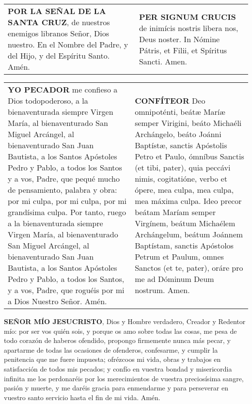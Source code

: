 \documentclass[./rosary.tex]{subfiles}
\begin{document}
\label{crossSignal}
\begin{longtable} { p{} p{} }
    \textbf{POR LA SEÑAL DE LA SANTA CRUZ}, de nuestros enemigos libranos Señor, Dios nuestro. En el Nombre del Padre,
    y del Hijo, y del Espíritu Santo. Amén.

     &

    \textbf{PER SIGNUM CRUCIS} de inimícis nostris libera nos, Deus noster. In Nómine Pátris, et Filii, et Spíritus Sancti. Amen.
\end{longtable}

\label{iConfess}
\begin{longtable} { p{} p{} }
    \textbf{YO PECADOR} me confieso a Dios todopoderoso, a la bienaventurada siempre Virgen María, al bienaventurado San Miguel Arcángel,
    al bienaventurado San Juan Bautista, a los Santos Apóstoles Pedro y Pablo, a todos los Santos y a vos, Padre, que pequé mucho
    de pensamiento, palabra y obra: por mi culpa, por mi culpa, por mi grandísima culpa. Por tanto, ruego a la bienaventurada
    siempre Virgen María, al bienaventurado San Miguel Arcángel, al bienaventurado San Juan Bautista, a los Santos Apóstoles
    Pedro y Pablo, a todos los Santos, y a vos, Padre, que roguéis por mi a Dios Nuestro Señor. Amén.
    
     &

    \textbf{CONFÍTEOR} Deo omnipoténti, beátæ Maríæ semper Virigini, beáto Michaéli Archángelo, beáto Joánni Baptístæ, sanctis Apóstolis Petro et Paulo,
    ómníbus Sanctis (et tibi, pater), quia peccávi nimis, cogitatióne, verbo et ópere, mea culpa, mea culpa, mea máxima culpa. Ideo precor beátam
    Maríam semper Virgínem, beátum Michaélem Archángelum, beátum Joánnem Baptístam, sanctis Apóstolos Petrum et Paulum, omnes Sanctos (et te, pater),
    oráre pro me ad Dóminum Deum nostrum. Amen.
\end{longtable}

\label{contrition}
\textbf{SEÑOR MÍO JESUCRISTO}, Dios y Hombre verdadero, Creador y Redentor mío: por ser vos quién sois, y porque os amo sobre todas las cosas,
me pesa de todo corazón de haberos ofendido, propongo firmemente nunca más pecar, y apartarme de todas las ocasiones de ofenderos,
confesarme, y cumplir la penitencia que me fuere impuesta; ofrézcoos mi vida, obras y trabajos en satisfacción de todos mis pecados;
y confío en vuestra bondad y misericordia infinita me los perdonaréis por los merecimientos de vuestra preciosísima sangre, pasión y muerte,
y me daréis gracia para enmendarme y para perseverar en vuestro santo servicio hasta el fin de mi vida. Amén.
\end{document}
